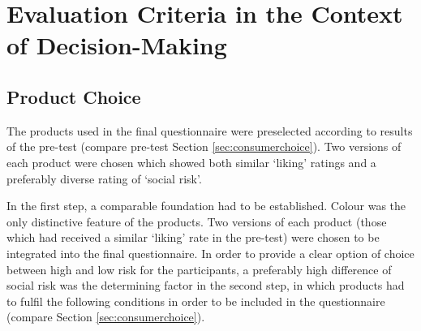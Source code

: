 \section{Evaluation Criteria in the Context of Decision-Making}
\subsection{Product Choice}
The products used in the final questionnaire were preselected according to results of the pre-test (compare pre-test Section \ref{sec:consumerchoice}). Two versions of each product were chosen which showed both similar ‘liking’ ratings and a preferably diverse rating of ‘social risk’. \par
In the first step, a comparable foundation had to be established. Colour was the only distinctive feature of the products. Two versions of each product (those which had received a similar  ‘liking’ rate in the pre-test) were chosen to be integrated into the final questionnaire. In order to provide a clear option of choice between high and low risk for the participants, a preferably high difference of social risk was the determining factor in the second step, in which products had to fulfil the following conditions in order to be included in the questionnaire (compare Section \ref{sec:consumerchoice}).\par

